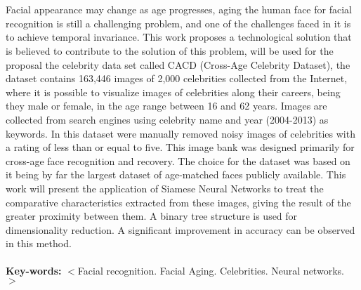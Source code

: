 \section*{} 
\singlespacing 
\noindent 
Facial appearance may change as age progresses, aging the human face for facial recognition is still a challenging problem, and one of the challenges faced in it is to achieve temporal invariance.
This work proposes a technological solution that is believed to contribute to the solution of this problem, will be used for the proposal the celebrity data set called CACD (Cross-Age Celebrity Dataset), the dataset contains 163,446 images of 2,000 celebrities collected from the Internet, where it is possible to visualize images of celebrities along their careers, being they male or female, in the age range between 16 and 62 years. Images are collected from search engines using celebrity name and year (2004-2013) as keywords. In this dataset were manually removed noisy images of celebrities with a rating of less than or equal to five. This image bank was designed primarily for cross-age face recognition and recovery. The choice for the dataset was based on it being by far the largest dataset of age-matched faces publicly available. This work will present the application of Siamese Neural Networks to treat the comparative characteristics extracted from these images, giving the result of the greater proximity between them.
A binary tree structure is used for dimensionality reduction. A significant improvement in accuracy can be observed in this method.
\\
\\
{\bf Key-words:} $<$Facial recognition. Facial Aging. Celebrities. Neural networks.
$>$
